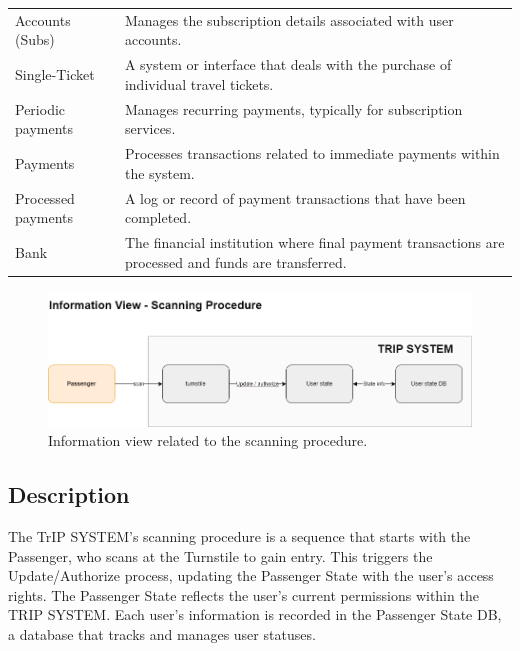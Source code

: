 \begin{table}[H]
\begin{tabularx}{\textwidth}{@{}lX@{}}
    Accounts (Subs) & Manages the subscription details associated with user accounts. \\
    Single-Ticket & A system or interface that deals with the purchase of individual travel tickets. \\
    Periodic payments & Manages recurring payments, typically for subscription services. \\
    Payments & Processes transactions related to immediate payments within the system. \\
    Processed payments & A log or record of payment transactions that have been completed. \\
    Bank & The financial institution where final payment transactions are processed and funds are transferred. \\
    \bottomrule
    \end{tabularx}
\end{table}

\begin{figure}[H]
    \centering
    \includegraphics[width=\textwidth]{drawings/views_final_version/information_view scanning.png}
    \caption{Information view related to the scanning procedure.}
    \label{fig:information_view_scanning}
\end{figure}

\subsection*{Description}
The TrIP SYSTEM's scanning procedure is a sequence that starts with the Passenger, who scans at the Turnstile to gain entry. This triggers the Update/Authorize process, updating the Passenger State with the user's access rights. The Passenger State reflects the user's current permissions within the TRIP SYSTEM. Each user’s information is recorded in the Passenger State DB, a database that tracks and manages user statuses.

